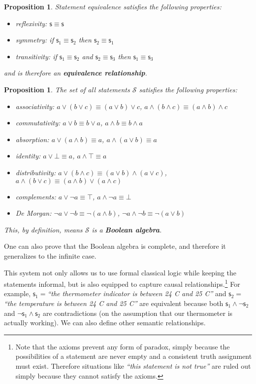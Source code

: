 \documentclass[letterpaper]{article}
\theoremstyle{plain}%
\newtheorem{prop}[thrm]{Proposition}
\theoremstyle{definition}
\theoremstyle{remark}
\numberwithin{equation}{section}
\def\tautology{\top}
\def\contradiction{\bot}
\def\AND{\wedge}
\def\OR{\vee}
\def\NOT{\neg}
\newcommand{\stmt}[1][s] {\mathsf{#1}}
\newcommand{\statement}[1] {\emph{``#1''}}
\begin{document}
\begin{prop}
	Statement equivalence satisfies the following properties:
	\begin{itemize}
		\item reflexivity: $\stmt \equiv \stmt$
		\item symmetry: if $\stmt_1 \equiv \stmt_2$ then $\stmt_2 \equiv \stmt_1$
		\item transitivity: if $\stmt_1 \equiv \stmt_2$ and $\stmt_2 \equiv \stmt_3$ then $\stmt_1 \equiv \stmt_3$
	\end{itemize}
	and is therefore an \textbf{equivalence relationship}.
\end{prop}

\begin{prop}\label{boolean_properties}
	The set of all statements $\mathcal{S}$ satisfies the following properties:
	\begin{itemize}
		\item associativity: $a \OR (b \OR c) \equiv (a \OR b) \OR c$, $a \AND (b \AND c) \equiv (a \AND b) \AND c$
		\item commutativity: $a \OR b \equiv b \OR a$, $a \AND b \equiv b \AND a$
		\item absorption: $a \OR (a \AND b) \equiv a$, $a \AND (a \OR b) \equiv a$
		\item identity: $a \OR \contradiction \equiv a
		$, $a \AND \tautology \equiv a$
		\item distributivity: $a \OR (b \AND c) \equiv (a \OR b) \AND (a \OR c)$, $a \AND (b \OR c) \equiv (a \AND b) \OR (a \AND c)$
		\item complements: $a \OR \NOT a \equiv \tautology$, $a \AND \NOT a \equiv \contradiction$
		\item De Morgan: $\NOT a \OR \NOT b \equiv \NOT (a \AND b)$, $\NOT a \AND \NOT b \equiv \NOT (a \OR b)$
	\end{itemize}
	This, by definition, means $\mathcal{S}$ is a \textbf{Boolean algebra}.
\end{prop}

One can also prove that the Boolean algebra is complete, and therefore it generalizes to the infinite case.

This system not only allows us to use formal classical logic while keeping the statements informal, but is also equipped to capture causal relationships.\footnote{Note that the axioms prevent any form of paradox, simply because the possibilities of a statement are never empty and a consistent truth assignment must exist. Therefore situations like \statement{this statement is not true} are ruled out simply because they cannot satisfy the axioms.} For example, $\stmt_1=$\statement{the thermometer indicator is between 24 C and 25 C} and $\stmt_2=$\statement{the temperature is between 24 C and 25 C} are equivalent because both $\stmt_1 \AND \NOT \stmt_2$ and $\NOT \stmt_1 \AND \stmt_2$ are contradictions (on the assumption that our thermometer is actually working). We can also define other semantic relationships.
\end{document}
